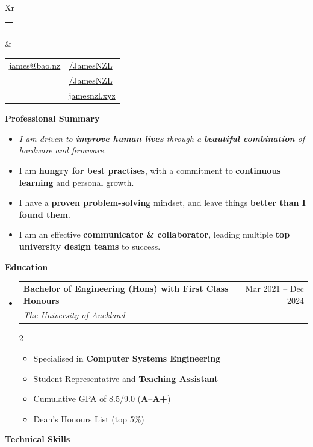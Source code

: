 \documentclass[11pt,a4paper]{article}[leftmargin=*]
\makeatletter
\def \fullname {James Bao}
\def \subtitle {}
\def \emailicon {\faAt}
\def \emaillink {mailto:james@bao.nz}
\def \emailtext {james@bao.nz}
\def \phoneicon {\faMobile}
\def \phonetext {+64 22 410 1580}
\def \addressicon {\faMapMarker*}
\def \addresstext {Auckland, New Zealand}
\def \linkedinicon {\faLinkedin}
\def \linkedinlink {https://www.linkedin.com/in/jamesnzl/}
\def \linkedintext {/JamesNZL}
\def \githubicon {\faGithub}
\def \githublink {https://github.com/jamesnzl}
\def \githubtext {/JamesNZL}
\def \websiteicon {\faGlobe}
\def \websitelink {https://jamesnzl.xyz/}
\def \websitetext {jamesnzl.xyz}
\def \headertype {\doublecol} %
\def \entryspacing {-0pt}
\def \bulletstylei {\faAngleRight\hspace{-4.5pt}}
\def \email {\emailicon \hspace{3pt}\href{\emaillink}{\emailtext}}
\def \phone {\phoneicon \hspace{3pt}{ \phonetext}}
\def \address {\addressicon \hspace{3pt}{\addresstext}}
\def \linkedin {\linkedinicon \hspace{3pt}\href{\linkedinlink}{\linkedintext}}
\def \github {\githubicon \hspace{3pt}\href{\githublink}{\githubtext}}
\def \website {\websiteicon \hspace{3pt}\href{\websitelink}{\websitetext}}
\renewcommand{\section}[2]{\vspace{5pt}
  \colorbox{secondary}{\color{white}\raggedbottom\normalsize\textbf{{#1}{\hspace{2pt}#2\hspace{4pt}}}}
}
\newcommand{\resumeEntryStart}{\begin{itemize}[leftmargin=2.5mm]}
\newcommand{\resumeEntryEnd}{\end{itemize}\vspace{\entryspacing}}
\newcommand{\resumeItemListStartColumns}[2][-0.5]{\vspace*{#1\multicolsep}
\begin{multicols}{#2}\begin{itemize}[leftmargin=4.5mm]}
\newcommand{\resumeItemListEndColumns}[1][-1]{\end{itemize}\end{multicols}\vspace*{#1\multicolsep}}
\newcommand{\resumeItem}[2][\bulletstylei]{
  \item[\small#1]\small{
    {#2 \vspace{-2pt}}
  }
}
\newcommand{\resumeEntryTSDL}[4]{
  \vspace{-1pt}\item[]
    \begin{tabularx}{0.97\textwidth}{X@{\hspace{60pt}}r}
      \textbf{\color{primary}#1} & {\firabook\color{accent}\small#2} \\
      \textit{\color{accent}\small#3} & \textit{\color{accent}\small#4} \\
    \end{tabularx}\vspace{-6pt}
}
\newcommand{\resumeEntryE}[1]{
  \item[]\small{
    \resumeIt{\small#1 \vspace{-4pt}}
  }\\
}
\newcommand{\resumeEntryP}[1]{
  \item[]\small{
    #1 \vspace{-4pt}
  }\\
}
\newcommand{\resumeIt}[1]{\textit{\color{accent}#1}}
\newcommand{\resumeBf}[1]{\small\textbf{\color{halfbold}#1}}
\newcommand{\doublecol}[6]{
  \begin{tabularx}{\textwidth}{Xr}
    {
      \begin{tabular}[c]{l}
        \fontsize{35}{45}\selectfont{\color{primary}{{\textbf{\fullname}}}} \\
        {\textit{\subtitle}} %
      \end{tabular}
    } & {
      \begin{tabular}[c]{l@{\hspace{1.5em}}l}
        {\small#4} & {\small#1} \\
        {\small#5} & {\small#2} \\
        {\small#6} & {\small#3}
      \end{tabular}
    }
  \end{tabularx}
}
\newcommand{\singlecol}[6]{
  \begin{tabularx}{\textwidth}{Xr}
    {
      \begin{tabular}[b]{l}
        \fontsize{35}{45}\selectfont{\color{primary}{{\textbf{\fullname}}}} \\
        {\textit{\subtitle}} %
      \end{tabular}
    } & {
      \begin{tabular}[c]{l}
        {\small#1} \\
        {\small#2} \\
        {\small#3} \\
        {\small#4} \\
        {\small#5} \\
        {\small#6}
      \end{tabular}
    }
  \end{tabularx}
}
\makeatother
\begin{document}

\headertype{\linkedin}{\github}{\website}{\email}{\phone}{\address} %
\vspace{-10pt} %


\section{\faCrosshairs}{Professional Summary}

\resumeEntryStart
\resumeEntryE{I am driven to \resumeBf{improve human lives} through a \resumeBf{beautiful combination} of hardware and firmware.}

\resumeEntryP{I am \resumeBf{hungry for best practises}, with a commitment to \resumeBf{continuous learning} and personal growth.}

\resumeEntryP{I have a \resumeBf{proven problem-solving} mindset, and leave things \resumeBf{better than I found them}.}

\resumeEntryP{I am an effective \resumeBf{communicator \& collaborator}, leading multiple \resumeBf{top university design teams} to success.}

\resumeEntryEnd


\section{\faGraduationCap}{Education}

\resumeEntryStart
\resumeEntryTSDL
{Bachelor of Engineering (Hons) with First Class Honours}{Mar 2021 -- Dec 2024}
{The University of Auckland}{}
\resumeItemListStartColumns[0.5]{2}
\resumeItem {Specialised in \resumeBf{Computer Systems Engineering}}
\resumeItem {Student Representative and \resumeBf{Teaching Assistant}}
\resumeItem {Cumulative GPA of 8.5/9.0 (\resumeBf{A}--\resumeBf{A+})}
\resumeItem {Dean's Honours List (top 5\%)}
\resumeItemListEndColumns
\resumeEntryEnd


\section{\faCogs}{Technical Skills}
\end{document}
